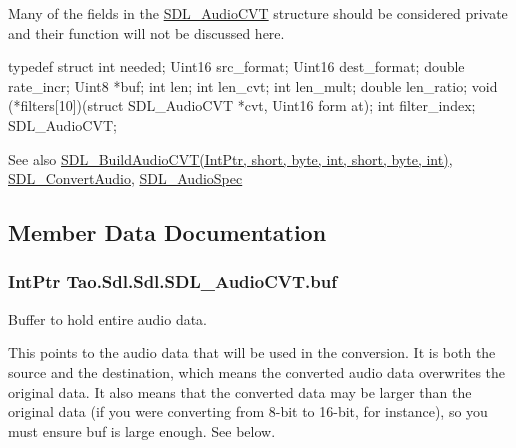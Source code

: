 Many of the fields in the \hyperlink{struct_tao_1_1_sdl_1_1_sdl_1_1_s_d_l___audio_c_v_t}{SDL\_\-AudioCVT} structure should be considered private and their function will not be discussed here. 


\begin{DoxyCode}
             typedef struct{
                        int needed;
                        Uint16 src_format;
                        Uint16 dest_format;
                        double rate_incr;
                        Uint8 *buf;
                        int len;
                        int len_cvt;
                        int len_mult;
                        double len_ratio;
                        void (*filters[10])(struct SDL_AudioCVT *cvt, Uint16 form
      at);
                                                                        int 
      filter_index;
                                                                } SDL_AudioCVT;
\end{DoxyCode}


\begin{DoxySeeAlso}{See also}
\hyperlink{_sdl_8cs_ab290a18bf5bf8a161042ceb8c43c5654}{SDL\_\-BuildAudioCVT(IntPtr, short, byte, int, short, byte, int)}, \hyperlink{_sdl_8cs_a7ed641a1e339dc97cfd58c08dd9af2e2}{SDL\_\-ConvertAudio}, \hyperlink{struct_tao_1_1_sdl_1_1_sdl_1_1_s_d_l___audio_spec}{SDL\_\-AudioSpec}


\end{DoxySeeAlso}


\subsection{Member Data Documentation}
\hypertarget{struct_tao_1_1_sdl_1_1_sdl_1_1_s_d_l___audio_c_v_t_a4b59d447082f4bb651fee2d3c540461b}{
\subsubsection[{buf}]{\setlength{\rightskip}{0pt plus 5cm}IntPtr {\bf Tao.Sdl.Sdl.SDL\_\-AudioCVT.buf}}}
\label{struct_tao_1_1_sdl_1_1_sdl_1_1_s_d_l___audio_c_v_t_a4b59d447082f4bb651fee2d3c540461b}


Buffer to hold entire audio data. 

This points to the audio data that will be used in the conversion. It is both the source and the destination, which means the converted audio data overwrites the original data. It also means that the converted data may be larger than the original data (if you were converting from 8-\/bit to 16-\/bit, for instance), so you must ensure buf is large enough. See below. 

